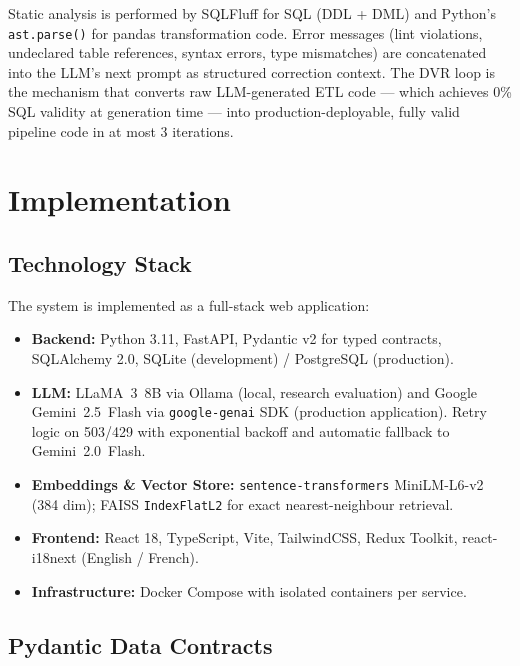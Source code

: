 \documentclass[9pt,a4paper,twocolumn,twoside]{rho-class/rho}
\begin{document}
        Static analysis is performed by SQLFluff \cite{sqlfluff} for SQL (DDL + DML) and Python's \texttt{ast.parse()} for pandas transformation code. Error messages (lint violations, undeclared table references, syntax errors, type mismatches) are concatenated into the LLM's next prompt as structured correction context. The DVR loop is the mechanism that converts raw LLM-generated ETL code --- which achieves 0\% SQL validity at generation time --- into production-deployable, fully valid pipeline code in at most 3 iterations.


\section{Implementation}
\label{sec:implementation}

    \subsection{Technology Stack}

        The system is implemented as a full-stack web application:

        \begin{itemize}
            \item \textbf{Backend:} Python 3.11, FastAPI, Pydantic v2 for typed contracts, SQLAlchemy 2.0, SQLite (development) / PostgreSQL (production).
            \item \textbf{LLM:} LLaMA~3~8B via Ollama (local, research evaluation) and Google Gemini~2.5~Flash via \texttt{google-genai} SDK (production application). Retry logic on 503/429 with exponential backoff and automatic fallback to Gemini~2.0~Flash.
            \item \textbf{Embeddings \& Vector Store:} \texttt{sentence-transformers} MiniLM-L6-v2 (384 dim); FAISS \texttt{IndexFlatL2} for exact nearest-neighbour retrieval.
            \item \textbf{Frontend:} React 18, TypeScript, Vite, TailwindCSS, Redux Toolkit, react-i18next (English / French).
            \item \textbf{Infrastructure:} Docker Compose with isolated containers per service.
        \end{itemize}

    \subsection{Pydantic Data Contracts}
\end{document}
